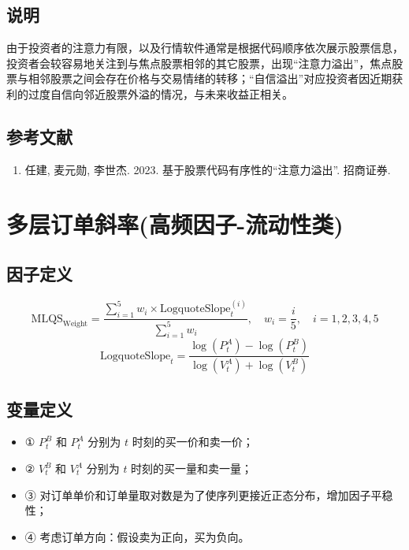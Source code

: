 \documentclass{article}
\begin{document}
\subsection{说明}
由于投资者的注意力有限，以及行情软件通常是根据代码顺序依次展示股票信息，投资者会较容易地关注到与焦点股票相邻的其它股票，出现“注意力溢出”，焦点股票与相邻股票之间会存在价格与交易情绪的转移；“自信溢出”对应投资者因近期获利的过度自信向邻近股票外溢的情况，与未来收益正相关。

\subsection{参考文献}
\begin{enumerate}
    \item 任建, 麦元勋, 李世杰. 2023. 基于股票代码有序性的“注意力溢出”. 招商证券.
\end{enumerate}

\section{多层订单斜率(高频因子-流动性类)}

\subsection{因子定义}
\begin{equation}
    \mathrm{MLQS}_{\mathrm{Weight}} = \frac{\sum_{i=1}^{5} w_i \times \mathrm{LogquoteSlope}_t^{(i)}}{\sum_{i=1}^{5} w_i}, \quad w_i = \frac{i}{5}, \quad i = 1, 2, 3, 4, 5
\end{equation}
\begin{equation}
    \mathrm{LogquoteSlope}_t = \frac{\log\left(P_t^A\right) - \log\left(P_t^B\right)}{\log\left(V_t^A\right) + \log\left(V_t^B\right)}
\end{equation}

\subsection{变量定义}
\begin{itemize}
    \item ① \( P_t^B \) 和 \( P_t^A \) 分别为 \( t \) 时刻的买一价和卖一价；
    \item ② \( V_t^B \) 和 \( V_t^A \) 分别为 \( t \) 时刻的买一量和卖一量；
    \item ③ 对订单单价和订单量取对数是为了使序列更接近正态分布，增加因子平稳性；
    \item ④ 考虑订单方向：假设卖为正向，买为负向。
\end{itemize}
\end{document}
